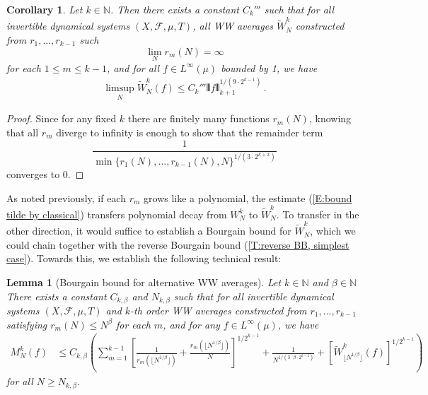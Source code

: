 \documentclass[11pt, oneside]{amsart}   	%
\newcommand{\1}{\mathbbm{1}}
\newcommand{\N}{\mathbb{N}}
\newcommand{\floor}[1]{\lfloor#1\rfloor}
\newtheorem{corollary}[theorem]{Corollary}
\newtheorem{lemma}[theorem]{Lemma}
\theoremstyle{definition}
\begin{document}
\begin{corollary}
Let $k\in \N$. Then there exists a constant $C_k'''$ such that for all invertible dynamical systems $(X, \mathcal{F}, \mu, T)$, all WW averages $\widetilde W_N^k$ constructed from $r_1, \dots, r_{k-1}$ such
$$\lim_{N} r_m(N) = \infty$$
for each $1\leq m \leq k-1$, and for all $f\in L^\infty(\mu)$ bounded by 1, we have
\begin{align*}
\limsup_N \widetilde W_N^k(f) \leq C_k''' \VERT f \VERT_{k+1}^{1/(9 \cdot 2^{k-1})} \, .
\end{align*}
\end{corollary}
\begin{proof}
Since for any fixed $k$ there are finitely many functions $r_m(N)$, knowing that all $r_m$ diverge to infinity is enough to show that the remainder term
$$\frac{1}{\min\{r_1(N), \dots, r_{k-1}(N), N\}^{1/(3 \cdot 2^{k+2})}}$$
converges to 0.
\end{proof}


As noted previously, if each $r_m$ grows like a polynomial, the estimate (\ref{E:bound tilde by classical}) transfers polynomial decay from $W_N^k$ to $\widetilde{W}_N^k$. To transfer in the other direction, it would suffice to establish a Bourgain bound for $\widetilde W_N^k$, which we could chain together with the reverse Bourgain bound (\ref{T:reverse BB, simplest case}). Towards this, we establish the following technical result:

\begin{lemma}[Bourgain bound for alternative WW averages]\label{L:BB for alt averages}
Let $k\in \N$ and $\beta \in \N$ There exists a constant $C_{k, \beta}$ and $N_{k, \beta}$ such that for all invertible dynamical systems $(X, \mathcal{F}, \mu, T)$ and $k$-th order WW averages constructed from $r_1, \dots, r_{k-1}$ satisfying $r_m(N) \leq N^\beta$ for each $m$, and for any $f\in L^\infty(\mu)$, we have
\begin{align*}
M_N^k(f) &\leq C_{k, \beta}\left(\sum_{m=1}^{k-1}\left[\frac{1}{r_m(\floor{N^{1/\beta}})} + \frac{r_m(\floor{N^{1/\beta}})}{N} \right]^{1/2^{k-1}} + \frac{1}{N^{1/(3\cdot \beta \cdot 2^{k-2})}}+ \left[\widetilde W_{\floor{N^{1/\beta}}}^k(f)\right]^{1/2^{k-1}} \right)
\end{align*}
for all $N\geq N_{k, \beta}$.
\end{lemma}
\end{document}
